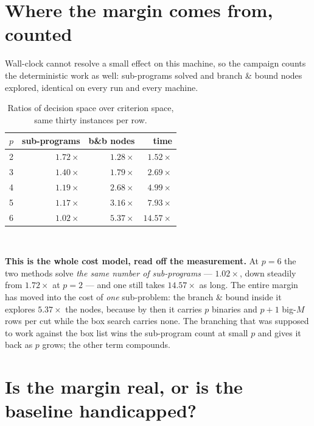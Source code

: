 \documentclass[11pt,a4paper]{article}
\begin{document}
\section{Where the margin comes from, counted}

Wall-clock cannot resolve a small effect on this machine, so the campaign
counts the deterministic work as well: sub-programs solved and branch \& bound
nodes explored, identical on every run and every machine.

\begin{table}[h]
\centering
\caption{Ratios of decision space over criterion space, same thirty instances
per row.}
\begin{tabular}{crrr}
\toprule
$p$ & sub-programs & b\&b nodes & time \\
\midrule
2 & $1.72\times$ & $1.28\times$ & $1.52\times$ \\
3 & $1.40\times$ & $1.79\times$ & $2.69\times$ \\
4 & $1.19\times$ & $2.68\times$ & $4.99\times$ \\
5 & $1.17\times$ & $3.16\times$ & $7.93\times$ \\
6 & $\mathbf{1.02\times}$ & $\mathbf{5.37\times}$ & $\mathbf{14.57\times}$ \\
\bottomrule
\end{tabular}
\end{table}

\begin{center}
\\[2pt]
\end{center}

\noindent
\textbf{This is the whole cost model, read off the measurement.}  At $p=6$ the
two methods solve \emph{the same number of sub-programs} --- $1.02\times$, down
steadily from $1.72\times$ at $p=2$ --- and one still takes $14.57\times$ as
long.  The entire margin has moved into the cost of \emph{one} sub-problem:
the branch \& bound inside it explores $5.37\times$ the nodes, because by then
it carries $p$ binaries and $p+1$ big-$M$ rows per cut while the box search
carries none.  The branching that was supposed to work against the box list
wins the sub-program count at small $p$ and gives it back as $p$ grows; the
other term compounds.

\section{Is the margin real, or is the baseline handicapped?}
\end{document}
